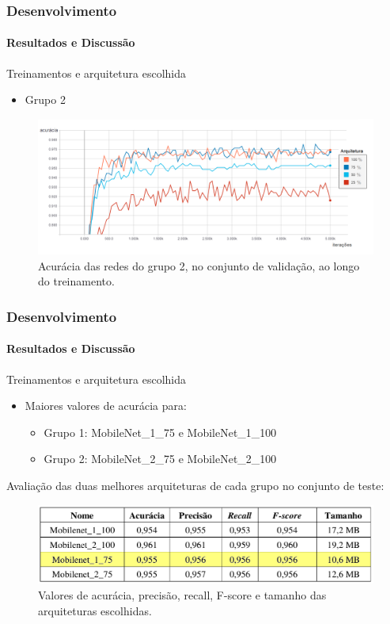 \documentclass{beamer}
\begin{document}
    \begin{frame}
      \frametitle{Desenvolvimento}
      \framesubtitle{Resultados e Discussão} \medskip       
      	Treinamentos e arquitetura escolhida \medskip    
      	\begin{itemize}
      		\item Grupo 2
		\end{itemize}      	  	
		\begin{figure}[t]
      		 \begin{minipage}[h]{1.0\linewidth}
         		\centering
      			\includegraphics[height=0.42\linewidth]{img/acc_2_5000.png}
      			\caption{Acurácia das redes do grupo 2, no conjunto de validação, ao longo do treinamento.}
      		\end{minipage}
      		\vspace{0.00mm}
      	\end{figure}	      	       
    \end{frame}
    
    \begin{frame}[t]
    		\frametitle{Desenvolvimento}
    		\framesubtitle{Resultados e Discussão}
       	Treinamentos e arquitetura escolhida \medskip    
    		\begin{itemize}
      		\item Maiores valores de acurácia para:
			\begin{itemize}
				\item Grupo 1: MobileNet\_1\_75 e MobileNet\_1\_100
				\item Grupo 2: MobileNet\_2\_75 e MobileNet\_2\_100 \medskip
			\end{itemize}	      		
		\end{itemize}		
		{
			Avaliação das duas melhores arquiteturas de cada grupo no conjunto de teste:
			\visible<3->
			{
				\begin{figure}[hbt]
      	 		\begin{center}
      			\includegraphics[height=.2 \textwidth]{img/all_metrics_2.png}
      			\end{center}
      			\caption{Valores de acurácia, precisão, recall, F-score e tamanho das arquiteturas escolhidas.}
      			\end{figure}	
			}
		}       	      	
    \end{frame}
	
\end{document}

